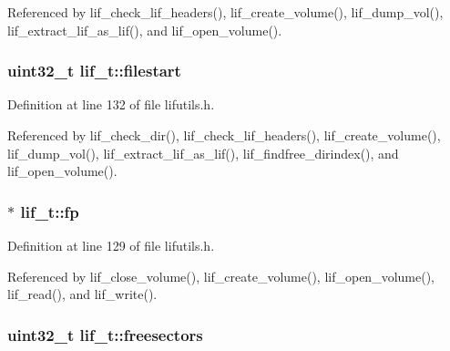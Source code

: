 Referenced by lif\+\_\+check\+\_\+lif\+\_\+headers(), lif\+\_\+create\+\_\+volume(), lif\+\_\+dump\+\_\+vol(), lif\+\_\+extract\+\_\+lif\+\_\+as\+\_\+lif(), and lif\+\_\+open\+\_\+volume().

\subsubsection[{\texorpdfstring{filestart}{filestart}}]{\setlength{\rightskip}{0pt plus 5cm}uint32\+\_\+t lif\+\_\+t\+::filestart}\hypertarget{structlif__t_a3c1bcc66b694d07ebc304ef7cb66b4ef}{}\label{structlif__t_a3c1bcc66b694d07ebc304ef7cb66b4ef}


Definition at line 132 of file lifutils.\+h.



Referenced by lif\+\_\+check\+\_\+dir(), lif\+\_\+check\+\_\+lif\+\_\+headers(), lif\+\_\+create\+\_\+volume(), lif\+\_\+dump\+\_\+vol(), lif\+\_\+extract\+\_\+lif\+\_\+as\+\_\+lif(), lif\+\_\+findfree\+\_\+dirindex(), and lif\+\_\+open\+\_\+volume().

\subsubsection[{\texorpdfstring{fp}{fp}}]{$\ast$ lif\+\_\+t\+::fp}\hypertarget{structlif__t_ad679ba16ca21371a649981a4cca9e64c}{}\label{structlif__t_ad679ba16ca21371a649981a4cca9e64c}


Definition at line 129 of file lifutils.\+h.



Referenced by lif\+\_\+close\+\_\+volume(), lif\+\_\+create\+\_\+volume(), lif\+\_\+open\+\_\+volume(), lif\+\_\+read(), and lif\+\_\+write().

\subsubsection[{\texorpdfstring{freesectors}{freesectors}}]{\setlength{\rightskip}{0pt plus 5cm}uint32\+\_\+t lif\+\_\+t\+::freesectors}\hypertarget{structlif__t_a1fc11461eb5643d84e229772f7623152}{}\label{structlif__t_a1fc11461eb5643d84e229772f7623152}



